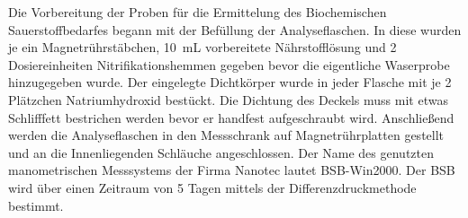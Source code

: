 Die Vorbereitung der Proben für die Ermittelung des Biochemischen Sauerstoffbedarfes begann mit der Befüllung der Analyseflaschen. In diese wurden je ein Magnetrührstäbchen, \SI{10}{\milli\liter} vorbereitete Nährstofflösung und 2 Dosiereinheiten Nitrifikationshemmen gegeben bevor die eigentliche Waserprobe hinzugegeben wurde. Der eingelegte Dichtkörper wurde in jeder Flasche mit je 2 Plätzchen Natriumhydroxid bestückt. Die Dichtung des Deckels muss mit etwas Schlifffett bestrichen werden bevor er handfest aufgeschraubt wird. Anschließend werden die Analyseflaschen in den Messschrank auf Magnetrührplatten gestellt und an die Innenliegenden Schläuche angeschlossen. Der Name des genutzten manometrischen Messsystems der Firma Nanotec lautet BSB-Win2000. Der BSB wird über einen Zeitraum von 5 Tagen mittels der Differenzdruckmethode bestimmt.

